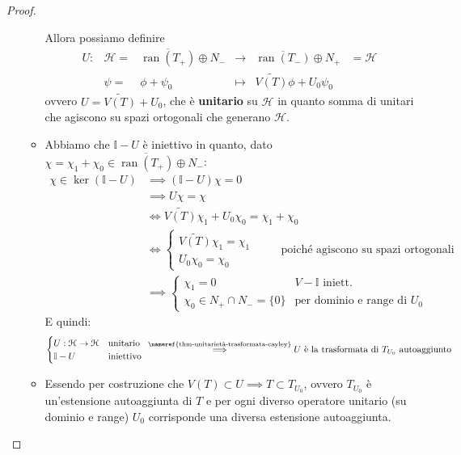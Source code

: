 \documentclass[a4paper,10pt]{article}
\theoremstyle{definition}
\DeclareMathOperator*{\ran}{ran}
\newcommand{\hil}{\mathcal{H}} %
\theoremstyle{indentdefinition}
\theoremstyle{indenttheorem}
\theoremstyle{myremark}
\theoremstyle{indentgeneral}
\begin{document}
\begin{proof}
\begin{itemize}
\begin{itemize}
    Allora possiamo definire
    $$\boxed{\begin{array}{cccccc}
        U: & \hil = & \overline{\ran(T_+)}  \oplus  N_- & \to & \overline{\ran(T_-)}  \oplus  N_+ &=\hil\\
         & \psi= & \phi + \psi_0 & \mapsto & \widetilde{V(T)}\phi+ U_0\psi_0 &
    \end{array}}$$
    ovvero $U=\widetilde{V(T)}+ U_0$, che è \textbf{unitario} su $\hil$ in quanto somma di unitari che  agiscono su spazi ortogonali che generano $\hil$.
    \item Abbiamo che $\mathbb{I}-U$ è  iniettivo in quanto, dato  $\chi=\chi_1+\chi_0\in \overline{\ran(T_+)}  \oplus  N_-$:
    \begin{align*}
        \chi\in\ker(\mathbb{I}-U)&\implies (\mathbb{I}-U)\chi=0\\
        &\implies U\chi=\chi\\
        &\iff \widetilde{V(T)}\chi_1+ U_0\chi_0=\chi_1+\chi_0\\
        &\iff \begin{cases}
            \widetilde{V(T)}\chi_1=\chi_1\\
            U_0\chi_0=\chi_0
        \end{cases} \qquad \text{ poiché agiscono su spazi ortogonali}\\
        &\implies \begin{cases}
            \chi_1=0 & V-\mathbb{I}\text{ iniett.}\\
            \chi_0\in N_+\cap N_-=\{0\} & \text{per dominio e range di }U_0
        \end{cases}
    \end{align*}
    E quindi:
    $$\begin{cases}
        U:\hil\to \hil & \text{unitario}\\
        \mathbb{I}-U & \text{iniettivo }
    \end{cases}\overset{\text{\nameref{thm-unitarietà-trasformata-cayley}}}{\implies} U\text{ è la trasformata di $T_{U_0}$ autoaggiunto}$$
    \item Essendo per costruzione che $V(T)\subset U\implies T\subset T_{U_0}$, ovvero $T_{U_0}$ è un'estensione autoaggiunta di $T$ e per ogni diverso operatore unitario (su dominio e range) $U_0$ corrisponde una diversa estensione autoaggiunta.
    \end{itemize}
    
\end{itemize}
\end{proof}
\end{document}
